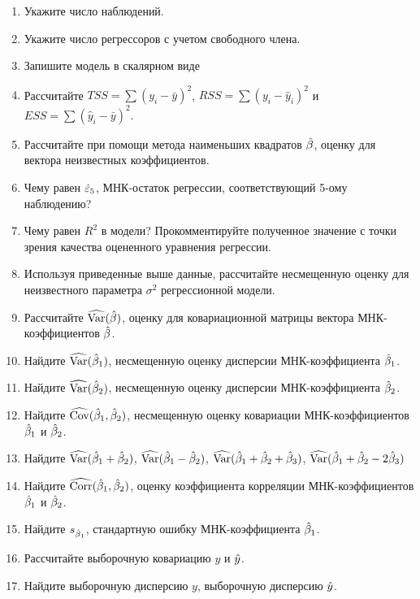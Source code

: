 \documentclass[pdftex,11pt,openany]{book}\usepackage[]{graphicx}\usepackage[]{color}
\begin{document}
\begin{problem}
\begin{enumerate}
\item Укажите число наблюдений.
\item Укажите число регрессоров с учетом свободного члена.
\item Запишите модель в скалярном виде
\item Рассчитайте $TSS=\sum (y_i-\bar{y})^2$, $RSS=\sum (y_i-\hat{y}_i)^2$ и $ESS=\sum (\hat{y}_i-\bar{y})^2$.
\item Рассчитайте при помощи метода наименьших квадратов $\hat{\beta}$, оценку для вектора неизвестных коэффициентов.
\item Чему равен $\hat{\varepsilon}_5$, МНК-остаток регрессии, соответствующий 5-ому наблюдению?
\item Чему равен $R^2$  в модели? Прокомментируйте полученное значение с точки зрения качества оцененного уравнения регрессии.
\item Используя приведенные выше данные, рассчитайте несмещенную оценку для неизвестного параметра $\sigma^2$ регрессионной модели.
\item Рассчитайте $\widehat{\operatorname{Var}}(\hat{\beta})$, оценку для ковариационной матрицы вектора МНК-коэффициентов $\hat{\beta}$.  
\item Найдите $\widehat{\operatorname{Var}}(\hat{\beta}_1)$, несмещенную оценку дисперсии МНК-коэффициента $\hat{\beta}_1$.
\item Найдите $\widehat{\operatorname{Var}}(\hat{\beta}_2)$, несмещенную оценку дисперсии МНК-коэффициента $\hat{\beta}_2$.
\item Найдите $\widehat{\operatorname{Cov}}(\hat{\beta}_1,\hat{\beta}_2)$, несмещенную оценку ковариации МНК-коэффициентов $\hat{\beta}_1$ и $\hat{\beta}_2$.
\item Найдите $\widehat{\operatorname{Var}}(\hat{\beta}_1+\hat{\beta}_2)$, $\widehat{\operatorname{Var}}(\hat{\beta}_1-\hat{\beta}_2)$, $\widehat{\operatorname{Var}}(\hat{\beta}_1+\hat{\beta}_2+\hat{\beta}_3)$, $\widehat{\operatorname{Var}}(\hat{\beta}_1+\hat{\beta}_2-2\hat{\beta}_3)$
\item Найдите $\widehat{\operatorname{Corr}}(\hat{\beta}_1,\hat{\beta}_2)$, оценку коэффициента корреляции МНК-коэффициентов $\hat{\beta}_1$ и $\hat{\beta}_2$.
\item Найдите $s_{\hat{\beta}_1}$, стандартную ошибку МНК-коэффициента $\hat{\beta}_1$.
\item Рассчитайте выборочную ковариацию $y$ и $\hat{y}$.
\item Найдите выборочную дисперсию $y$, выборочную дисперсию $\hat{y}$.
\end{enumerate}
\end{problem}
\begin{solution}
\end{solution}
\end{document}
